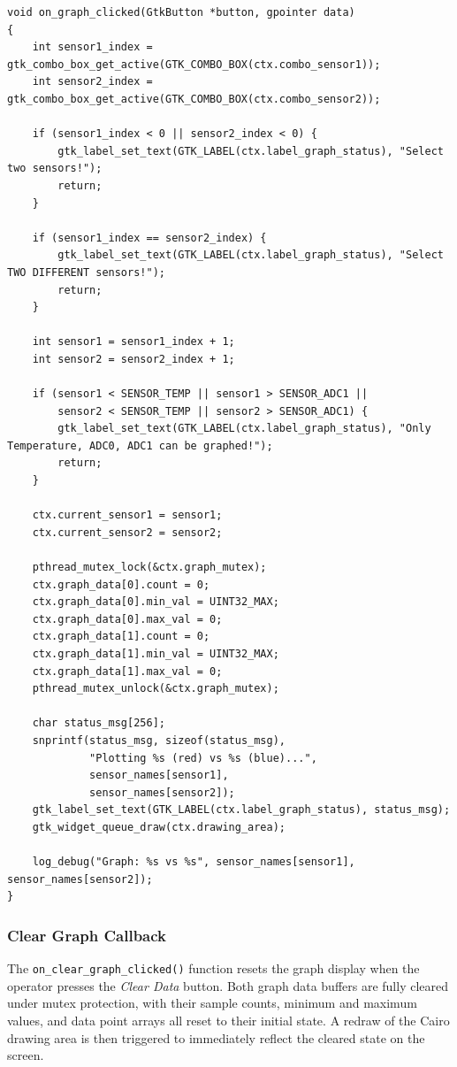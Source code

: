 \begin{verbatim}
void on_graph_clicked(GtkButton *button, gpointer data)
{
    int sensor1_index = gtk_combo_box_get_active(GTK_COMBO_BOX(ctx.combo_sensor1));
    int sensor2_index = gtk_combo_box_get_active(GTK_COMBO_BOX(ctx.combo_sensor2));

    if (sensor1_index < 0 || sensor2_index < 0) {
        gtk_label_set_text(GTK_LABEL(ctx.label_graph_status), "Select two sensors!");
        return;
    }

    if (sensor1_index == sensor2_index) {
        gtk_label_set_text(GTK_LABEL(ctx.label_graph_status), "Select TWO DIFFERENT sensors!");
        return;
    }

    int sensor1 = sensor1_index + 1;
    int sensor2 = sensor2_index + 1;

    if (sensor1 < SENSOR_TEMP || sensor1 > SENSOR_ADC1 ||
        sensor2 < SENSOR_TEMP || sensor2 > SENSOR_ADC1) {
        gtk_label_set_text(GTK_LABEL(ctx.label_graph_status), "Only Temperature, ADC0, ADC1 can be graphed!");
        return;
    }

    ctx.current_sensor1 = sensor1;
    ctx.current_sensor2 = sensor2;

    pthread_mutex_lock(&ctx.graph_mutex);
    ctx.graph_data[0].count = 0;
    ctx.graph_data[0].min_val = UINT32_MAX;
    ctx.graph_data[0].max_val = 0;
    ctx.graph_data[1].count = 0;
    ctx.graph_data[1].min_val = UINT32_MAX;
    ctx.graph_data[1].max_val = 0;
    pthread_mutex_unlock(&ctx.graph_mutex);

    char status_msg[256];
    snprintf(status_msg, sizeof(status_msg),
             "Plotting %s (red) vs %s (blue)...",
             sensor_names[sensor1],
             sensor_names[sensor2]);
    gtk_label_set_text(GTK_LABEL(ctx.label_graph_status), status_msg);
    gtk_widget_queue_draw(ctx.drawing_area);

    log_debug("Graph: %s vs %s", sensor_names[sensor1], sensor_names[sensor2]);
}
\end{verbatim}


\subsubsection{Clear Graph Callback}

The \texttt{on\_clear\_graph\_clicked()} function resets the graph display
when the operator presses the \textit{Clear Data} button. Both graph data
buffers are fully cleared under mutex protection, with their sample
counts, minimum and maximum values, and data point arrays all reset to
their initial state. A redraw of the Cairo drawing area is then triggered
to immediately reflect the cleared state on the screen.

